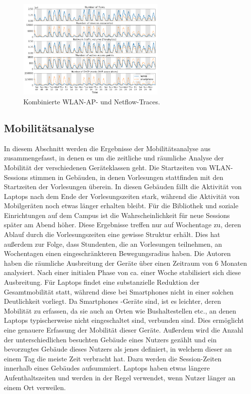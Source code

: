 \documentclass[12pt, a4paper]{article}
\begin{document}
\begin{figure}[H]
    \centering
    \includegraphics[width=0.65\textwidth]{img/traces.png}
    \caption{Kombinierte WLAN-AP- und Netflow-Traces. \cite{Alipour2018}}
    \label{fig:traces}
\end{figure}

\subsection{Mobilitätsanalyse}
\label{sec:phase2_a}

In diesem Abschnitt werden die Ergebnisse der Mobilitätsanalyse aus \cite{Alipour2018} zusammengefasst, in denen es
um die zeitliche und räumliche Analyse der Mobilität der verschiedenen Geräteklassen geht.
Die Startzeiten von WLAN-Sessions stimmen in Gebäuden, in denen Vorlesungen stattfinden mit den Startzeiten der Vorlesungen überein.
In diesen Gebäuden fällt die Aktivität von Laptops nach dem Ende der Vorlesungszeiten stark, während die Aktivität von Mobilgeräten
noch etwas länger erhalten bleibt. Für die Bibliothek und soziale Einrichtungen auf dem Campus ist die Wahrscheinlichkeit
für neue Sessions später am Abend höher. Diese Ergebnisse treffen nur auf Wochentage zu, deren Ablauf durch
die Vorlesungszeiten eine gewisse Struktur erhält.
Dies hat außerdem zur Folge, dass Stundenten, die an Vorlesungen teilnehmen, an Wochentagen einen eingeschränkteren Bewegungsradius haben.
Die Autoren haben die räumliche Ausbreitung der Geräte über einen Zeitraum von $6$ Monaten analysiert.
Nach einer initialen Phase von ca. einer Woche stabilisiert sich diese Ausbreitung. Für Laptops findet eine 
substanzielle Reduktion der Gesamtmobilität statt, während diese bei Smartphones nicht in einer solchen Deutlichkeit vorliegt.
Da Smartphones -Geräte sind, ist es leichter, deren Mobilität zu erfassen, da sie auch an Orten
wie Bushaltestellen etc., an denen Laptops typischerweise nicht eingeschaltet sind, verbunden sind.
Dies ermöglicht eine genauere Erfassung der Mobilität dieser Geräte.
Außerdem wird die Anzahl der unterschiedlichen besuchten Gebäude eines Nutzers gezählt und ein bevorzugtes
Gebäude dieses Nutzers als jenes definiert, in welchem dieser an einem Tag die meiste Zeit verbracht hat.
Dazu werden die Session-Zeiten innerhalb eines Gebäudes aufsummiert.
Laptops haben etwas längere Aufenthaltszeiten und werden in der Regel verwendet, wenn Nutzer länger an einem Ort verweilen.
\end{document}
